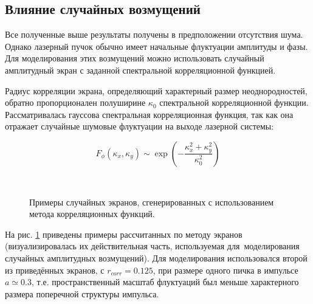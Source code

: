 \subsection{Влияние случайных возмущений}

Все полученные выше результаты получены в предположении отсутствия шума. \mbox{Однако} лазерный пучок обычно имеет начальные флуктуации амплитуды и фазы.
Для моделирования этих возмущений можно использовать случайный амплитудный экран с заданной спектральной корреляционной функцией.

Радиус корреляции экрана, определяющий характерный размер
неоднородностей, обратно пропорционален полуширине $\kappa_0$ спектральной корреляционной
функции. Рассматривалась гауссова спектральная корреляционная функция, так как
она отражает случайные шумовые флуктуации на выходе лазерной системы:

\begin{equation}
    F_{\phi}(\kappa_x, \kappa_y) \sim \exp\left( -\frac{\kappa_x^2 + \kappa_y^2}{\kappa_0^2} \right)
\end{equation}


\begin{figure}[h!]
    \begin{center}
        \begin{minipage}{\minipagewidththree}
        \end{minipage}
        \hspace{\minipagewidthpadding}
        \begin{minipage}{\minipagewidththree}
        \end{minipage}
        \\[1ex]
        \caption{Примеры случайных экранов, сгенерированных с использованием метода корреляционных функций.}
        \label{fig:BeamsPhasescreenExamples}
    \end{center}
\end{figure}


На рис. \ref{fig:BeamsPhasescreenExamples} приведены примеры рассчитанных
по методу \cite{ShlenovKandidovTurbulence2004} экранов
(визуализировалась их действительная часть, используемая для~моделирования случайных амплитудных возмущений).                                      
Для моделирования использовался второй из приведённых экранов,
с $r_{corr} = 0.125$, при размере одного пичка в импульсе $a \simeq 0.3$, т.е. пространственный масштаб флуктуаций был меньше
характерного размера поперечной структуры импульса.

